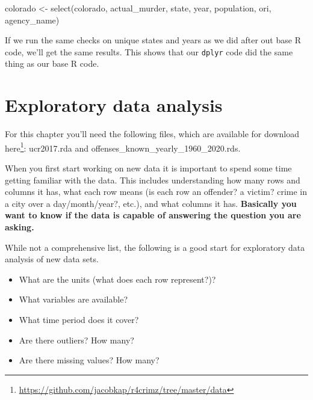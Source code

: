 \documentclass[
]{krantz}
\makeatletter
\newenvironment{Shaded}{\begin{snugshade}}{\end{snugshade}}
\newcommand{\CommentTok}[1]{\textcolor[rgb]{0.37,0.37,0.37}{\textit{#1}}}
\newcommand{\FunctionTok}[1]{\textcolor[rgb]{0,0,0}{#1}}
\newcommand{\NormalTok}[1]{#1}
\newcommand{\OtherTok}[1]{\textcolor[rgb]{0.37,0.37,0.37}{#1}}
\newcommand{\SpecialCharTok}[1]{\textcolor[rgb]{0,0,0}{#1}}
\providecommand{\tightlist}{%
  \setlength{\itemsep}{0pt}\setlength{\parskip}{0pt}}
\renewcommand{\href}[2]{#2\footnote{\url{#1}}}
\newenvironment{kframe}{%
\medskip{}
\setlength{\fboxsep}{.8em}
 \def\at@end@of@kframe{}%
 \ifinner\ifhmode%
  \def\at@end@of@kframe{\end{minipage}}%
  \begin{minipage}{\columnwidth}%
 \fi\fi%
 \def\FrameCommand##1{\hskip\@totalleftmargin \hskip-\fboxsep
 \colorbox{shadecolor}{##1}\hskip-\fboxsep
     \hskip-\linewidth \hskip-\@totalleftmargin \hskip\columnwidth}%
 \MakeFramed {\advance\hsize-\width
   \@totalleftmargin\z@ \linewidth\hsize
   \@setminipage}}%
 {\par\unskip\endMakeFramed%
 \at@end@of@kframe}
\renewenvironment{Shaded}{\begin{kframe}}{\end{kframe}}
\makeatother
\begin{document}
\begin{Shaded}
\begin{Highlighting}[]
\NormalTok{colorado }\OtherTok{\textless{}{-}} \FunctionTok{select}\NormalTok{(colorado, actual\_murder, state, year, population, ori, agency\_name)}
\end{Highlighting}
\end{Shaded}

If we run the same checks on unique states and years as we did after out base R code, we'll get the same results. This shows that our \texttt{dplyr} code did the same thing as our base R code.

\begin{Shaded}
\end{Shaded}

\begin{Shaded}
\end{Shaded}

\hypertarget{explore}{%
\chapter{Exploratory data analysis}\label{explore}}

For this chapter you'll need the following files, which are available for download \href{https://github.com/jacobkap/r4crimz/tree/master/data}{here}: ucr2017.rda and offenses\_known\_yearly\_1960\_2020.rds.

When you first start working on new data it is important to spend some time getting familiar with the data. This includes understanding how many rows and columns it has, what each row means (is each row an offender? a victim? crime in a city over a day/month/year?, etc.), and what columns it has. \textbf{Basically you want to know if the data is capable of answering the question you are asking.}

While not a comprehensive list, the following is a good start for exploratory data analysis of new data sets.

\begin{itemize}
\tightlist
\item
  What are the units (what does each row represent?)?
\item
  What variables are available?
\item
  What time period does it cover?
\item
  Are there outliers? How many?
\item
  Are there missing values? How many?
\end{itemize}
\end{document}
